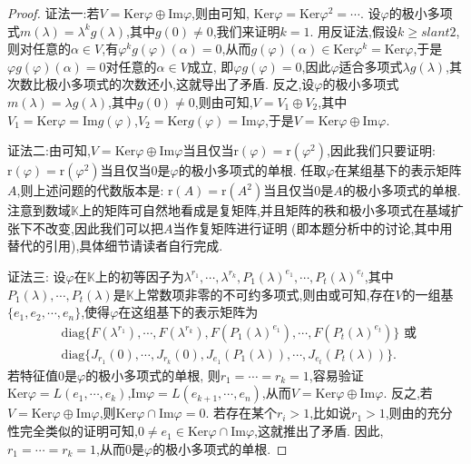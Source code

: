 \documentclass[../../main.tex]{subfiles}
\begin{document}
\begin{proof}
{\color{blue}证法一:}若$V=\mathrm{Ker}\varphi\oplus\mathrm{Im}\varphi$,则由可知, $\mathrm{Ker}\varphi=\mathrm{Ker}\varphi^2=\cdots$. 设$\varphi$的极小多项式$m(\lambda)=\lambda^kg(\lambda)$,其中$g(0)\neq 0$,我们来证明$k = 1$. 用反证法,假设$k\geqslant slant 2$,则对任意的$\alpha\in V$,有$\varphi^kg(\varphi)(\alpha)=0$,从而$g(\varphi)(\alpha)\in\mathrm{Ker}\varphi^k=\mathrm{Ker}\varphi$,于是$\varphi g(\varphi)(\alpha)=0$对任意的$\alpha\in V$成立, 即$\varphi g(\varphi)=0$,因此$\varphi$适合多项式$\lambda g(\lambda)$,其次数比极小多项式的次数还小,这就导出了矛盾. 反之,设$\varphi$的极小多项式$m(\lambda)=\lambda g(\lambda)$,其中$g(0)\neq 0$,则由可知,$V = V_1\oplus V_2$,其中$V_1=\mathrm{Ker}\varphi=\mathrm{Im}g(\varphi)$,$V_2=\mathrm{Ker}g(\varphi)=\mathrm{Im}\varphi$,于是$V=\mathrm{Ker}\varphi\oplus\mathrm{Im}\varphi$.

{\color{blue}证法二:}由可知,$V=\mathrm{Ker}\varphi\oplus\mathrm{Im}\varphi$当且仅当$\mathrm{r}(\varphi)=\mathrm{r}(\varphi^2)$,因此我们只要证明: $\mathrm{r}(\varphi)=\mathrm{r}(\varphi^2)$当且仅当$0$是$\varphi$的极小多项式的单根. 任取$\varphi$在某组基下的表示矩阵$A$,则上述问题的代数版本是: $\mathrm{r}(A)=\mathrm{r}(A^2)$当且仅当$0$是$A$的极小多项式的单根. 注意到数域$\mathbb{K}$上的矩阵可自然地看成是复矩阵,并且矩阵的秩和极小多项式在基域扩张下不改变,因此我们可以把$A$当作复矩阵进行证明 (即本题分析中的讨论,其中用替代的引用),具体细节请读者自行完成.

{\color{blue}证法三:}
设$\varphi$在$\mathbb{K}$上的初等因子为$\lambda^{r_1},\cdots,\lambda^{r_k},P_1(\lambda)^{e_1},\cdots,P_t(\lambda)^{e_t}$,其中$P_1(\lambda),\cdots,P_t(\lambda)$是$\mathbb{K}$上常数项非零的不可约多项式,则由或可知,存在$V$的一组基$\{e_1,e_2,\cdots,e_n\}$,使得$\varphi$在这组基下的表示矩阵为
\begin{align*}
&\mathrm{diag}\{F(\lambda^{r_1}),\cdots,F(\lambda^{r_k}),F(P_1(\lambda)^{e_1}),\cdots,F(P_t(\lambda)^{e_t})\}\text{ 或 }\\
&\mathrm{diag}\{J_{r_1}(0),\cdots,J_{r_k}(0),J_{e_1}(P_1(\lambda)),\cdots,J_{e_t}(P_t(\lambda))\}.
\end{align*}
若特征值$0$是$\varphi$的极小多项式的单根, 则$r_1 = \cdots = r_k = 1$,容易验证$\mathrm{Ker}\varphi = L(e_1,\cdots,e_k)$,$\mathrm{Im}\varphi = L(e_{k + 1},\cdots,e_n)$,从而$V = \mathrm{Ker}\varphi\oplus\mathrm{Im}\varphi$. 反之,若$V = \mathrm{Ker}\varphi\oplus\mathrm{Im}\varphi$,则$\mathrm{Ker}\varphi\cap\mathrm{Im}\varphi = 0$. 若存在某个$r_i > 1$,比如说$r_1 > 1$,则由的充分性完全类似的证明可知,$0\neq e_1\in\mathrm{Ker}\varphi\cap\mathrm{Im}\varphi$,这就推出了矛盾. 因此,$r_1 = \cdots = r_k = 1$,从而$0$是$\varphi$的极小多项式的单根. 
\end{proof}
\end{document}
